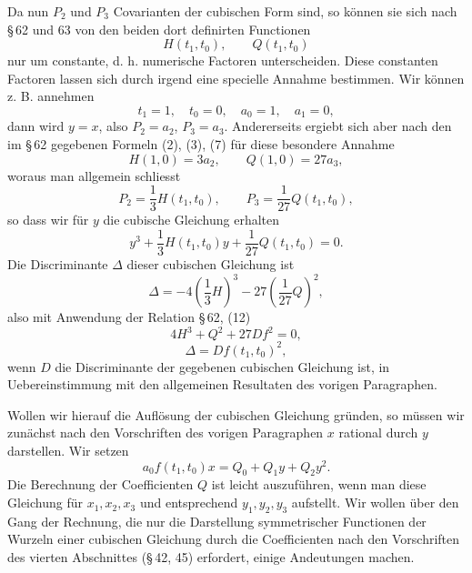 \documentclass[11pt]{article}
\begin{document}
Da nun $P_2$ und $P_3$ Covarianten der cubischen Form sind, so können sie sich nach \S\,62 und 63 von den beiden dort definirten Functionen
\[
 H(t_1,t_0),
 \qquad
 Q(t_1,t_0)
\]
nur um constante, d. h. numerische Factoren unterscheiden. Diese constanten Factoren lassen sich durch irgend eine specielle Annahme bestimmen. Wir können z. B. annehmen
\[
 t_1=1,
 \quad t_0=0,
 \quad a_0=1,
 \quad a_1=0,
\]
dann wird $y=x$, also $P_2=a_2$, $P_3=a_3$. Andererseits ergiebt sich aber nach den im \S\,62 gegebenen Formeln (2), (3), (7) für diese besondere Annahme
\[
 H(1,0)=3a_2,
 \qquad
 Q(1,0)=27a_3,
\]
woraus man allgemein schliesst
\[
 P_2=\frac13H(t_1,t_0),
 \qquad
 P_3=\frac1{27}Q(t_1,t_0),
\]
so dass wir für $y$ die cubische Gleichung erhalten
\begin{equation}
 y^3+\frac13H(t_1,t_0)y+\frac1{27}Q(t_1,t_0)=0.
\tag{6}
\end{equation}
Die Discriminante $\Delta$ dieser cubischen Gleichung ist
\[
 \Delta=-4\left(\frac13H\right)^3-27\left(\frac1{27}Q\right)^2,
\]
also mit Anwendung der Relation \S\,62, (12)
\begin{equation}
 4H^3+Q^2+27Df^2=0,
\tag{7}
\end{equation}
\begin{equation}
 \Delta=Df(t_1,t_0)^2,
\tag{8}
\end{equation}
wenn $D$ die Discriminante der gegebenen cubischen Gleichung ist, in Uebereinstimmung mit den allgemeinen Resultaten des vorigen Paragraphen.

Wollen wir hierauf die Auflösung der cubischen Gleichung gründen, so müssen wir zunächst nach den Vorschriften des vorigen Paragraphen $x$ rational durch $y$ darstellen. Wir setzen
\begin{equation}
 a_0f(t_1,t_0)x=Q_0+Q_1y+Q_2y^2.
\tag{9}
\end{equation}
Die Berechnung der Coefficienten $Q$ ist leicht auszuführen, wenn man diese Gleichung für $x_1,x_2,x_3$ und entsprechend $y_1,y_2,y_3$ aufstellt. Wir wollen über den Gang der Rechnung, die nur die Darstellung symmetrischer Functionen der Wurzeln einer cubischen Gleichung durch die Coefficienten nach den Vorschriften des vierten Abschnittes (\S\,42, 45) erfordert, einige Andeutungen machen.
\end{document}
